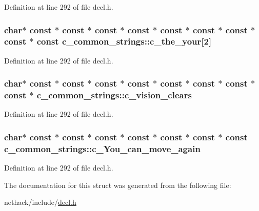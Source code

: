 Definition at line 292 of file decl.\+h.

\hypertarget{structc__common__strings_a97d9b0808dd1b9c2f929a33b3a2d55d7}{
\subsubsection[{c\+\_\+the\+\_\+your}]{ char$\ast$ {\bf const} $\ast$ {\bf const} $\ast$ {\bf const} $\ast$ {\bf const} $\ast$ {\bf const} $\ast$ {\bf const} $\ast$ {\bf const} $\ast$ {\bf const} $\ast$ {\bf const} c\+\_\+common\+\_\+strings\+::c\+\_\+the\+\_\+your\mbox{[}2\mbox{]}}}\label{structc__common__strings_a97d9b0808dd1b9c2f929a33b3a2d55d7}


Definition at line 292 of file decl.\+h.

\hypertarget{structc__common__strings_aad9acac53dcc0289f0aec4c99889d469}{
\subsubsection[{c\+\_\+vision\+\_\+clears}]{ char$\ast$ {\bf const} $\ast$ {\bf const} $\ast$ {\bf const} $\ast$ {\bf const} $\ast$ {\bf const} $\ast$ {\bf const} $\ast$ {\bf const} $\ast$ {\bf const} $\ast$ c\+\_\+common\+\_\+strings\+::c\+\_\+vision\+\_\+clears}}\label{structc__common__strings_aad9acac53dcc0289f0aec4c99889d469}


Definition at line 292 of file decl.\+h.

\hypertarget{structc__common__strings_aa539553ca9e6bf754223fde7eabe89c8}{
\subsubsection[{c\+\_\+\+You\+\_\+can\+\_\+move\+\_\+again}]{ char$\ast$ {\bf const} $\ast$ {\bf const} $\ast$ {\bf const} $\ast$ {\bf const} $\ast$ {\bf const} $\ast$ {\bf const} $\ast$ {\bf const} c\+\_\+common\+\_\+strings\+::c\+\_\+\+You\+\_\+can\+\_\+move\+\_\+again}}\label{structc__common__strings_aa539553ca9e6bf754223fde7eabe89c8}


Definition at line 292 of file decl.\+h.



The documentation for this struct was generated from the following file\+:\begin{DoxyCompactItemize}
\item 
nethack/include/\hyperlink{decl_8h}{decl.\+h}\end{DoxyCompactItemize}
